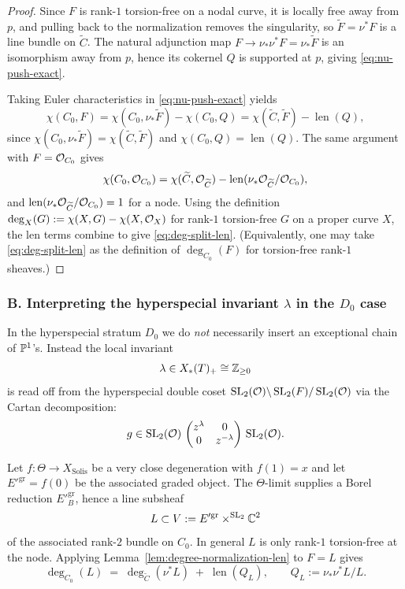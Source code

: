 \documentclass[12pt]{article}
\DeclareMathOperator{\len}{len}
\begin{document}
\begin{proof}
Since $F$ is rank-$1$ torsion-free on a nodal curve, it is locally free away
from $p$, and pulling back to the normalization removes the singularity, so
$\widetilde F=\nu^*F$ is a line bundle on $\widetilde C$. The natural adjunction
map $F\to \nu_*\nu^*F=\nu_*\widetilde F$ is an isomorphism away from $p$, hence
its cokernel $Q$ is supported at $p$, giving \eqref{eq:nu-push-exact}.

Taking Euler characteristics in \eqref{eq:nu-push-exact} yields
\[
\chi(C_0,F)=\chi(C_0,\nu_*\widetilde F)-\chi(C_0,Q)=\chi(\widetilde C,\widetilde F)-\len(Q),
\]
since $\chi(C_0,\nu_*\widetilde F)=\chi(\widetilde C,\widetilde F)$ and
$\chi(C_0,Q)=\len(Q)$. The same argument with $F=\cO_{C_0}$ gives
\[
\chi(C_0,\cO_{C_0})=\chi(\widetilde C,\cO_{\widetilde C})-\len(\nu_*\cO_{\widetilde C}/\cO_{C_0}),
\]
and $\len(\nu_*\cO_{\widetilde C}/\cO_{C_0})=1$ for a node. Using the
definition $\deg_X(G):=\chi(X,G)-\chi(X,\cO_X)$ for rank-$1$ torsion-free $G$ on
a proper curve $X$, the len terms combine to give \eqref{eq:deg-split-len}.
(Equivalently, one may take \eqref{eq:deg-split-len} as the definition of
$\deg_{C_0}(F)$ for torsion-free rank-$1$ sheaves.)
\end{proof}

\subsubsection*{B. Interpreting the hyperspecial invariant $\lambda$ in the $D_0$ case}

In the hyperspecial stratum $D_0$ we do \emph{not} necessarily insert an
exceptional chain of $\P^1$'s. Instead the local invariant
\[
\lambda\in X_*(T)_+\cong \Z_{\ge 0}
\]
is read off from the hyperspecial double coset
$\SL_2(\cO)\backslash \SL_2(F)/\SL_2(\cO)$ via the Cartan decomposition:
\[
g \in \SL_2(\cO)\,
\begin{pmatrix} z^\lambda & 0 \\ 0 & z^{-\lambda}\end{pmatrix}
\,\SL_2(\cO).
\]

Let $f:\Theta\to X_{\mathrm{Solis}}$ be a very close degeneration with $f(1)=x$
and let $E'^{\mathrm{gr}}=f(0)$ be the associated graded object. The $\Theta$-limit
supplies a Borel reduction $E'^{\mathrm{gr}}_B$, hence a line subsheaf
\[
L \subset V:=E'^{\mathrm{gr}}\times^{\SL_2}\C^2
\]
of the associated rank-$2$ bundle on $C_0$. In general $L$ is only rank-$1$
torsion-free at the node. Applying Lemma~\ref{lem:degree-normalization-len}
to $F=L$ gives
\begin{equation}
\label{eq:D0-degree-normalization-plus-lambda}
\deg_{C_0}(L)
\;=\;
\deg_{\widetilde C}(\nu^*L)
\;+\;
\len(Q_L),
\qquad
Q_L:=\nu_*\nu^*L/L.
\end{equation}
\end{document}
